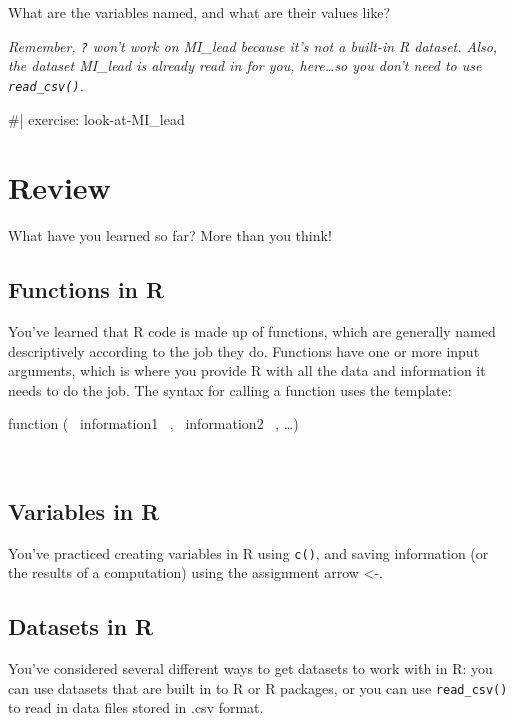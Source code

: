 \documentclass[
  letterpaper,
  DIV=11,
  numbers=noendperiod]{scrreprt}
\newenvironment{Shaded}{\begin{snugshade}}{\end{snugshade}}
\newcommand{\NormalTok}[1]{\textcolor[rgb]{0.00,0.23,0.31}{#1}}
\theoremstyle{remark}
\begin{document}
What are the variables named, and what are their values like?

\emph{Remember, \texttt{?} won't work on MI\_lead because it's not a
built-in R dataset. Also, the dataset MI\_lead is already read in for
you, here\ldots so you don't need to use \texttt{read\_csv()}.}

\begin{Shaded}
\begin{Highlighting}[]
\NormalTok{\#| exercise: look{-}at{-}MI\_lead}
\end{Highlighting}
\end{Shaded}

\section{Review}\label{review}

What have you learned so far? More than you think!

\subsection{Functions in R}\label{functions-in-r}

You've learned that R code is made up of functions, which are generally
named descriptively according to the job they do. Functions have one or
more input arguments, which is where you provide R with all the data and
information it needs to do the job. The syntax for calling a function
uses the template:

{function} ( ~information1~ , ~information2~ , \ldots)

~

\subsection{Variables in R}\label{variables-in-r}

You've practiced creating variables in R using \texttt{c()}, and saving
information (or the results of a computation) using the assignment arrow
\textless-.

\subsection{Datasets in R}\label{datasets-in-r}

You've considered several different ways to get datasets to work with in
R: you can use datasets that are built in to R or R packages, or you can
use \texttt{read\_csv()} to read in data files stored in .csv format.
\end{document}
